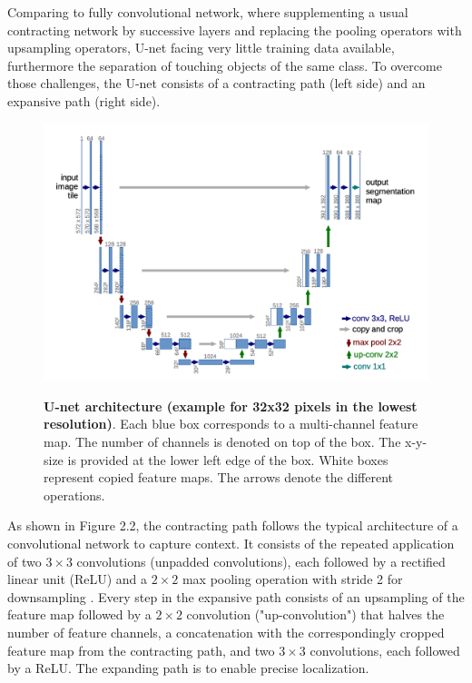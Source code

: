 Comparing to fully convolutional network, where supplementing a usual contracting network by successive layers and replacing the pooling operators with upsampling operators,  U-net \cite{unet} facing very little training data available, furthermore the separation of touching objects of the same class. To overcome those challenges, the U-net consists of a contracting path (left side) and an expansive path (right side). 

\begin{figure}[t]
\begin{center}
\centering
\includegraphics[width=\textwidth]{thesis-template-master/images/unet.png}
\label{fig:cellnet}
\end{center}
\caption{\textbf{U-net architecture (example for 32x32 pixels in the lowest resolution)\cite{unet}}. Each blue box corresponds to a multi-channel feature map. The number of channels is denoted on top of the box. The x-y-size is provided at the lower left edge of the box. White boxes represent copied feature maps. The arrows denote the different operations.}
\end{figure}

As shown in Figure 2.2, the contracting path follows the typical architecture of a convolutional network to capture context. It consists of the repeated application of two $3\times3$ convolutions (unpadded convolutions), each followed by a rectified linear unit (ReLU) and a $2\times2$ max pooling operation with stride 2 for downsampling \cite{unet}. Every step in the expansive path consists of an upsampling of the feature map followed by a $2\times2$ convolution ("up-convolution") that halves the number of feature channels, a concatenation with the correspondingly cropped feature map from the contracting path, and two $3\times3$ convolutions, each followed by a ReLU\cite{unet}. The expanding path is to enable precise localization.

